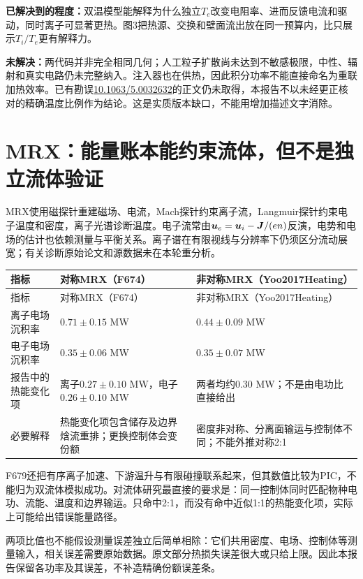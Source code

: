 \textbf{已解决到的程度：}双温模型能解释为什么独立$T_e$改变电阻率、进而反馈电流和驱动，同时离子可显著更热。图3把热源、交换和壁面流出放在同一预算内，比只展示$T_i/T_e$更有解释力。

\textbf{未解决：}两代码并非完全相同几何；人工粒子扩散尚未达到不敏感极限，中性、辐射和真实电路仍未完整纳入。注入器也在供热，因此积分功率不能直接命名为重联加热效率。已有勘误\href{https://doi.org/10.1063/5.0032632}{10.1063/5.0032632}的正文仍未取得，本报告不以未经更正核对的精确温度比例作为结论。这是实质版本缺口，不能用增加描述文字消除。

\section{MRX：能量账本能约束流体，但不是独立流体验证}
MRX使用磁探针重建磁场、电流，Mach探针约束离子流，Langmuir探针约束电子温度和密度，离子光谱诊断温度。电子流常由$\bm{u}_e=\bm{u}_i-\bm{J}/(en)$反演，电势和电场的估计也依赖测量与平衡关系。离子谱在有限视线与分辨率下仍须区分流动展宽；有关诊断原始论文和源数据未在本轮重分析。\citep{F679,F674,Yoo2017Heating}

\begin{longtable}{P{39mm}P{50mm}P{59mm}}
\toprule 指标 & 对称MRX（F674） & 非对称MRX（Yoo2017Heating）\\\midrule\endfirsthead
\toprule 指标 & 对称MRX（F674） & 非对称MRX（Yoo2017Heating）\\\midrule\endhead
离子电场沉积率 & $0.71\pm0.15$ MW & $0.44\pm0.09$ MW\\
电子电场沉积率 & $0.35\pm0.06$ MW & $0.35\pm0.07$ MW\\
报告中的热能变化项 & 离子$0.27\pm0.10$ MW，电子$0.26\pm0.10$ MW & 两者均约0.30 MW；不是由电功比直接给出\\
必要解释 & 热能变化项包含储存及边界焓流重排；更换控制体会变份额 & 密度非对称、分离面输运与控制体不同；不能外推对称2:1\\
\bottomrule\end{longtable}

F679还把有序离子加速、下游温升与有限碰撞联系起来，但其数值比较为PIC，不能归为双流体模拟成功。对流体研究最直接的要求是：同一控制体同时匹配物种电功、流能、温度和边界输运。只命中2:1，而没有命中近似1:1的热能变化项，实际上可能给出错误能量路径。

两项比值也不能假设测量误差独立后简单相除：它们共用密度、电场、控制体等测量输入，相关误差需要原始数据。原文部分热损失误差很大或只给上限。因此本报告保留各功率及其误差，不补造精确份额误差条。

